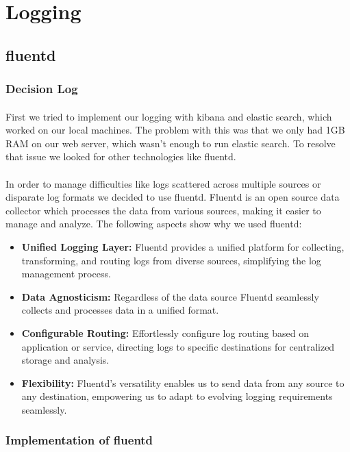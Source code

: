 \section{Logging}
\subsection{fluentd}
\subsubsection{Decision Log}
\paragraph{} First we tried to implement our logging with kibana and elastic search, which worked on our local machines. The problem with this was that we only had 1GB RAM on our web server,  which wasn't enough to run elastic search. To resolve that issue we looked for other technologies like fluentd.

\paragraph{} In order to manage difficulties like logs scattered across multiple sources or disparate log formats we decided to use fluentd. Fluentd is an open source data collector which processes the data from various sources, making it easier to manage and analyze. The following aspects show why we used fluentd: 
\begin{itemize}
    \item \textbf{Unified Logging Layer:} Fluentd provides a unified platform for collecting, transforming, and routing logs from diverse sources, simplifying the log management process.
    \item \textbf{Data Agnosticism:} Regardless of the data source Fluentd seamlessly collects and processes data in a unified format.
    \item \textbf{Configurable Routing:} Effortlessly configure log routing based on application or service, directing logs to specific destinations for centralized storage and analysis.
    \item \textbf{Flexibility:} Fluentd's versatility enables us to send data from any source to any destination, empowering us to adapt to evolving logging requirements seamlessly.
\end{itemize}

\subsubsection{Implementation of fluentd}
